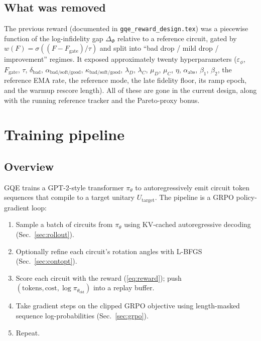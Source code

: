 \documentclass[11pt]{article}
\begin{document}
\subsection{What was removed}

The previous reward (documented in \texttt{gqe\_reward\_design.tex}) was a
piecewise function of the log-infidelity gap $\Delta_\Phi$ relative to a
reference circuit, gated by $w(F)=\sigma((F-F_{\mathrm{gate}})/\tau)$ and
split into ``bad drop / mild drop / improvement'' regimes. It exposed
approximately twenty hyperparameters
($\varepsilon_\phi$, $F_{\mathrm{gate}}$, $\tau$, $\delta_{\mathrm{bad}}$,
$\alpha_{\mathrm{bad/soft/good}}$, $\kappa_{\mathrm{bad/soft/good}}$,
$\lambda_D$, $\lambda_C$, $\mu_D$, $\mu_C$, $\eta$, $\alpha_{\mathrm{abs}}$,
$\beta_1$, $\beta_2$, the reference EMA rate, the reference mode, the late
fidelity floor, its ramp epoch, and the warmup rescore length). All of
these are gone in the current design, along with the running reference
tracker and the Pareto-proxy bonus.

\section{Training pipeline}

\subsection{Overview}

GQE trains a GPT-2-style transformer $\pi_\theta$ to autoregressively emit
circuit token sequences that compile to a target unitary $U_{\mathrm{target}}$.
The pipeline is a GRPO policy-gradient loop:

\begin{enumerate}[leftmargin=1.8em]
  \item Sample a batch of circuits from $\pi_\theta$ using KV-cached
  autoregressive decoding (Sec.~\ref{sec:rollout}).
  \item Optionally refine each circuit's rotation angles with L-BFGS
  (Sec.~\ref{sec:contopt}).
  \item Score each circuit with the reward (\ref{eq:reward}); push
  $(\text{tokens}, \text{cost}, \log\pi_{\theta_{\mathrm{old}}})$ into a
  replay buffer.
  \item Take gradient steps on the clipped GRPO objective using
  length-masked sequence log-probabilities (Sec.~\ref{sec:grpo}).
  \item Repeat.
\end{enumerate}
\end{document}
